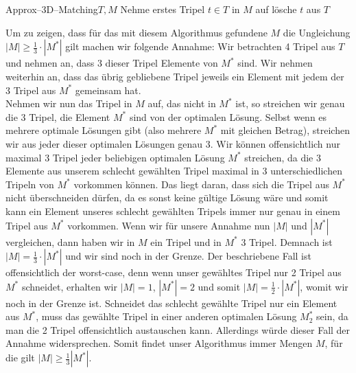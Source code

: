 \documentclass[a4paper]{article}
\begin{document}
	\section{}
		\begin{pseudocode}{Approx--3D--Matching}{$T,M$}
			\Repeat
				\State Nehme erstes Tripel $t\in T$ in $M$ auf
						\State lösche $t$ aus $T$
					\EndIf
				\EndFor
		\end{pseudocode}
		Um zu zeigen, dass für das mit diesem Algorithmus gefundene $M$ die Ungleichung $|M|\geq\frac{1}{3}\cdot |M^*|$ gilt machen wir folgende Annahme:\n
		Wir betrachten 4 Tripel aus $T$ und nehmen an, dass 3 dieser Tripel Elemente von $M^*$ sind.
		Wir nehmen weiterhin an, dass das übrig gebliebene Tripel jeweils ein Element mit jedem der 3 Tripel aus $M^*$ gemeinsam hat.\\
		Nehmen wir nun das Tripel in $M$ auf, das nicht in $M^*$ ist, so streichen wir genau die 3 Tripel, die Element $M^*$ sind von der optimalen Lösung.
		Selbst wenn es mehrere optimale Lösungen gibt (also mehrere $M^*$ mit gleichen Betrag), streichen wir aus jeder dieser optimalen Lösungen genau 3.\n
		Wir können offensichtlich nur maximal 3 Tripel jeder beliebigen optimalen Lösung $M^*$ streichen, da die 3 Elemente aus unserem schlecht gewählten Tripel maximal in 3 unterschiedlichen Tripeln von $M^*$ vorkommen können.
		Das liegt daran, dass sich die Tripel aus $M^*$ nicht überschneiden dürfen, da es sonst keine gültige Lösung wäre und somit kann ein Element unseres schlecht gewählten Tripels immer nur genau in einem Tripel aus $M^*$ vorkommen.
		Wenn wir für unsere Annahme nun $|M|$ und $|M^*|$ vergleichen, dann haben wir in $M$ ein Tripel und in $M^*$ 3 Tripel. Demnach ist $|M|= \frac{1}{3}\cdot |M^*|$ und wir sind noch in der Grenze.\n
		Der beschriebene Fall ist offensichtlich der worst-case, denn wenn unser gewähltes Tripel nur 2 Tripel aus $M^*$ schneidet, erhalten wir $|M|=1$, $|M^*|=2$ und somit $|M|=\frac{1}{2}\cdot |M^*|$, womit wir noch in der Grenze ist. Schneidet das schlecht gewählte Tripel nur ein Element aus $M^*$, muss das gewählte Tripel in einer anderen optimalen Lösung $M_{2}^*$ sein, da man die 2 Tripel offensichtlich austauschen kann. Allerdings würde dieser Fall der Annahme widersprechen.\n
		Somit findet unser Algorithmus immer Mengen $M$, für die gilt $|M|\geq \frac{1}{3}|M^*|$.
\end{document}
